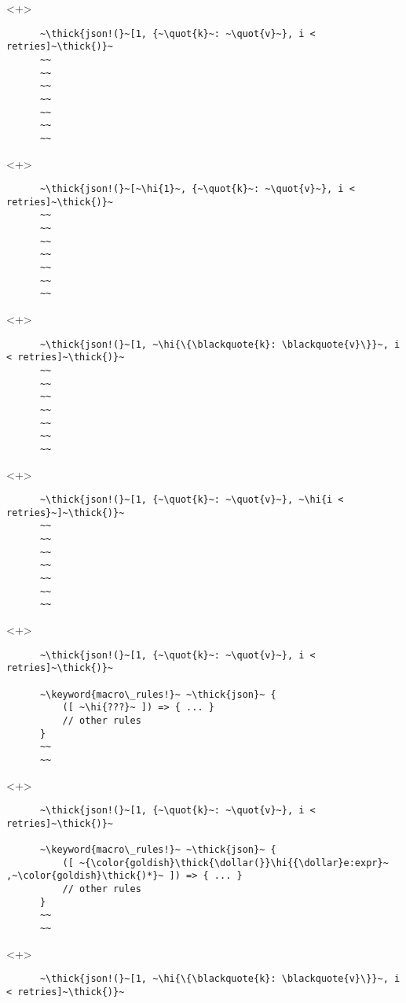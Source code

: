 \documentclass[usepdftitle=false]{beamer}
\newcommand{\dollar}{\makebox[\widthof{\$}][c]{\$}}
\newcommand{\thick}[1]{\contourlength{0.16pt}\contour[10]{black}{#1}}
\newcommand{\slantbox}[2][.5]
  {%
    \mbox
      {%
        \sbox{\foobox}{#2}%
        \hskip\wd\foobox
        \pdfsave
        \pdfsetmatrix{1 0 #1 1}%
        \llap{\usebox{\foobox}}%
        \pdfrestore
      }%
  }
\newcommand{\backslantbox}[2][.5]
  {%
    \mbox
      {%
        \sbox{\foobox}{#2}%
        \hskip\wd\foobox
        \pdfsave
        \pdfsetmatrix{-1 0 #1 1}%
        \llap{\usebox{\foobox}}%
        \pdfrestore
      }%
  }
\newcommand{\hi}[1]{%
\tikz[baseline=(A.base)]
 \node[highlighting=yellowbg,inner sep=0pt,text depth=0pt] (A) {#1};%
}
\newcommand{\openquote}{\backslantbox[.2]{\hspace{11pt}''\hspace{-11pt}}}
\newcommand{\closequote}{\slantbox[-.2]{\hspace{2pt}''\hspace{-2pt}}}
\newcommand{\blackquote}[1]{\openquote#1\closequote}
\newcommand{\quot}[1]{{\color{redish}\blackquote{#1}}}
\newcommand{\keyword}[1]{\color{greenish}#1}
\begin{document}
\begin{frame}[fragile]
  \begin{onlyenv}<+>
    \begin{verbatim}
      ~\thick{json!(}~[1, {~\quot{k}~: ~\quot{v}~}, i < retries]~\thick{)}~
      ~~
      ~~
      ~~
      ~~
      ~~
      ~~
      ~~
    \end{verbatim}
  \end{onlyenv}
  \begin{onlyenv}<+>
    \begin{verbatim}
      ~\thick{json!(}~[~\hi{1}~, {~\quot{k}~: ~\quot{v}~}, i < retries]~\thick{)}~
      ~~
      ~~
      ~~
      ~~
      ~~
      ~~
      ~~
    \end{verbatim}
  \end{onlyenv}
  \begin{onlyenv}<+>
    \begin{verbatim}
      ~\thick{json!(}~[1, ~\hi{\{\blackquote{k}: \blackquote{v}\}}~, i < retries]~\thick{)}~
      ~~
      ~~
      ~~
      ~~
      ~~
      ~~
      ~~
    \end{verbatim}
  \end{onlyenv}
  \begin{onlyenv}<+>
    \begin{verbatim}
      ~\thick{json!(}~[1, {~\quot{k}~: ~\quot{v}~}, ~\hi{i < retries}~]~\thick{)}~
      ~~
      ~~
      ~~
      ~~
      ~~
      ~~
      ~~
    \end{verbatim}
  \end{onlyenv}
  \begin{onlyenv}<+>
    \begin{verbatim}
      ~\thick{json!(}~[1, {~\quot{k}~: ~\quot{v}~}, i < retries]~\thick{)}~

      ~\keyword{macro\_rules!}~ ~\thick{json}~ {
          ([ ~\hi{???}~ ]) => { ... }
          // other rules
      }
      ~~
      ~~
    \end{verbatim}
  \end{onlyenv}
  \begin{onlyenv}<+>
    \begin{verbatim}
      ~\thick{json!(}~[1, {~\quot{k}~: ~\quot{v}~}, i < retries]~\thick{)}~

      ~\keyword{macro\_rules!}~ ~\thick{json}~ {
          ([ ~{\color{goldish}\thick{\dollar(}}\hi{{\dollar}e:expr}~ ,~\color{goldish}\thick{)*}~ ]) => { ... }
          // other rules
      }
      ~~
      ~~
    \end{verbatim}
  \end{onlyenv}
  \begin{onlyenv}<+>
    \begin{verbatim}
      ~\thick{json!(}~[1, ~\hi{\{\blackquote{k}: \blackquote{v}\}}~, i < retries]~\thick{)}~


\end{verbatim}
\end{onlyenv}
\end{frame}
\end{document}
